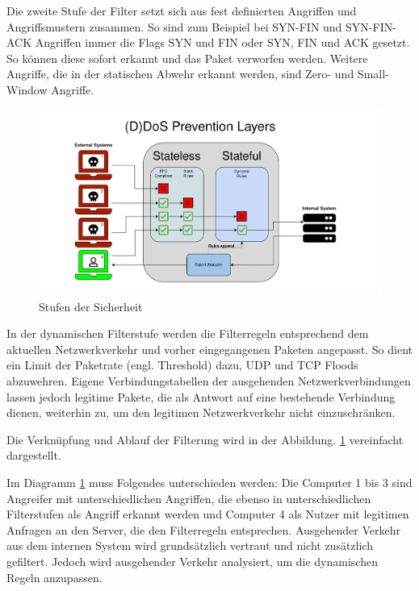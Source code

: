 \documentclass[../review_3.tex]{subfiles}
\begin{document}
Die zweite Stufe der Filter setzt sich aus fest definierten Angriffen und Angriffsmustern zusammen. So sind zum Beispiel bei SYN-FIN und SYN-FIN-ACK Angriffen immer die Flags SYN und FIN oder SYN, FIN und ACK gesetzt. So können diese sofort erkannt und das Paket verworfen werden. Weitere Angriffe, die in der statischen Abwehr erkannt werden, sind Zero- und Small-Window Angriffe.

\begin{figure}[H]
    \centering
    \includegraphics[width=\linewidth]{img/Security_Layers.png}
    \caption{Stufen der Sicherheit}
    \label{security_layers}
\end{figure}

In der dynamischen Filterstufe werden die Filterregeln entsprechend dem aktuellen Netzwerkverkehr und vorher eingegangenen Paketen angepasst. So dient ein Limit der Paketrate (engl. Threshold) dazu, UDP und TCP Floods abzuwehren. Eigene Verbindungstabellen der ausgehenden Netzwerkverbindungen lassen jedoch legitime Pakete, die als Antwort auf eine bestehende Verbindung dienen, weiterhin zu, um den legitimen Netzwerkverkehr nicht einzuschränken.

Die Verknüpfung und Ablauf der Filterung wird in der Abbildung. \ref{security_layers} vereinfacht dargestellt.

Im Diagramm \ref{security_layers} muss Folgendes unterschieden werden: Die Computer 1 bis 3 sind Angreifer mit unterschiedlichen Angriffen, die ebenso in unterschiedlichen Filterstufen als Angriff erkannt werden und Computer 4 als Nutzer mit legitimen Anfragen an den Server, die den Filterregeln entsprechen.
Ausgehender Verkehr aus dem internen System wird grundsätzlich vertraut und nicht zusätzlich gefiltert. Jedoch wird ausgehender Verkehr analysiert, um die dynamischen Regeln anzupassen.
\end{document}
